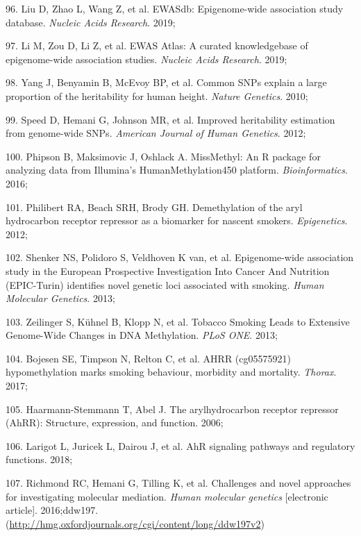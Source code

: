 \documentclass[11pt,oneside]{bristolthesis}
\newenvironment{cslreferences}%
  {}%
  {\par}
\begin{document}
\begin{cslreferences}
\leavevmode\hypertarget{ref-Liu2019}{}%
96. Liu D, Zhao L, Wang Z, et al. EWASdb: Epigenome-wide association study database. \emph{Nucleic Acids Research}. 2019;

\leavevmode\hypertarget{ref-Li2019}{}%
97. Li M, Zou D, Li Z, et al. EWAS Atlas: A curated knowledgebase of epigenome-wide association studies. \emph{Nucleic Acids Research}. 2019;

\leavevmode\hypertarget{ref-Yang2010}{}%
98. Yang J, Benyamin B, McEvoy BP, et al. Common SNPs explain a large proportion of the heritability for human height. \emph{Nature Genetics}. 2010;

\leavevmode\hypertarget{ref-Speed2012}{}%
99. Speed D, Hemani G, Johnson MR, et al. Improved heritability estimation from genome-wide SNPs. \emph{American Journal of Human Genetics}. 2012;

\leavevmode\hypertarget{ref-Phipson2016}{}%
100. Phipson B, Maksimovic J, Oshlack A. MissMethyl: An R package for analyzing data from Illumina's HumanMethylation450 platform. \emph{Bioinformatics}. 2016;

\leavevmode\hypertarget{ref-Philibert2012}{}%
101. Philibert RA, Beach SRH, Brody GH. Demethylation of the aryl hydrocarbon receptor repressor as a biomarker for nascent smokers. \emph{Epigenetics}. 2012;

\leavevmode\hypertarget{ref-Shenker2013}{}%
102. Shenker NS, Polidoro S, Veldhoven K van, et al. Epigenome-wide association study in the European Prospective Investigation Into Cancer And Nutrition (EPIC-Turin) identifies novel genetic loci associated with smoking. \emph{Human Molecular Genetics}. 2013;

\leavevmode\hypertarget{ref-Zeilinger2013}{}%
103. Zeilinger S, Kühnel B, Klopp N, et al. Tobacco Smoking Leads to Extensive Genome-Wide Changes in DNA Methylation. \emph{PLoS ONE}. 2013;

\leavevmode\hypertarget{ref-Bojesen2017}{}%
104. Bojesen SE, Timpson N, Relton C, et al. AHRR (cg05575921) hypomethylation marks smoking behaviour, morbidity and mortality. \emph{Thorax}. 2017;

\leavevmode\hypertarget{ref-Haarmann-Stemmann2006}{}%
105. Haarmann-Stemmann T, Abel J. The arylhydrocarbon receptor repressor (AhRR): Structure, expression, and function. 2006;

\leavevmode\hypertarget{ref-Larigot2018}{}%
106. Larigot L, Juricek L, Dairou J, et al. AhR signaling pathways and regulatory functions. 2018;

\leavevmode\hypertarget{ref-Richmond2016}{}%
107. Richmond RC, Hemani G, Tilling K, et al. Challenges and novel approaches for investigating molecular mediation. \emph{Human molecular genetics} {[}electronic article{]}. 2016;ddw197. (\url{http://hmg.oxfordjournals.org/cgi/content/long/ddw197v2})


\end{cslreferences}
\end{document}
